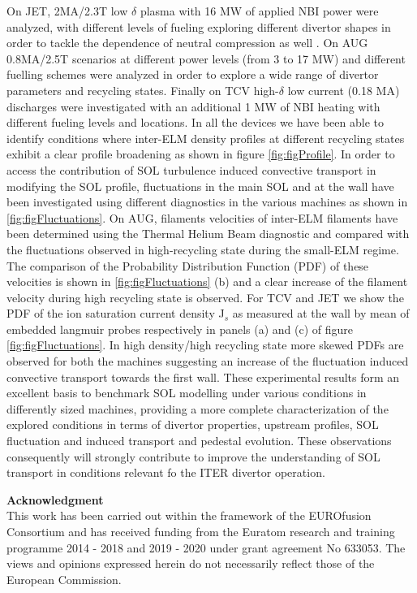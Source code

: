 \documentclass[12pt, a4paper, twoside]{article}
\begin{document}
On JET, 2MA/2.3T low $\delta$ plasma with 16 MW of
applied NBI power were analyzed, with different levels of fueling exploring different divertor shapes
in order to tackle the dependence of neutral compression as well
\cite{Tamain:2015cx}.
On AUG 0.8MA/2.5T scenarios at different power levels (from 3 to 17 MW) and different fuelling
schemes were analyzed in order to explore a wide range of divertor
parameters and recycling states.
Finally on TCV high-$\delta$ low current (0.18 MA)
discharges were investigated with an additional 1 MW of NBI heating
with different fueling levels and locations. In all the devices we have been able to
identify conditions where inter-ELM density profiles at different recycling states exhibit a clear profile broadening as shown in
figure \ref{fig:figProfile}. In order to access the contribution of SOL
turbulence induced convective transport in modifying the SOL profile,
fluctuations in the main SOL and at the wall have been investigated
using different diagnostics in the various machines as shown in
\ref{fig:figFluctuations}. On AUG,  filaments velocities of
inter-ELM filaments have been determined using the Thermal Helium Beam
diagnostic \cite{Griener:20183cf} and compared with the fluctuations
observed in high-recycling state during the small-ELM regime. The
comparison of the Probability Distribution Function (PDF) of these velocities is shown in
\ref{fig:figFluctuations} (b) and a clear increase of the filament velocity
during high recycling state is observed. For TCV and JET we show the
PDF of the ion saturation current
density J$_s$ as measured at the wall by mean of embedded langmuir
probes respectively in panels (a) and (c) of figure
\ref{fig:figFluctuations}.
In high density/high recycling state more skewed PDFs are
observed for both the machines suggesting an increase of the
fluctuation induced convective transport towards the first wall.
These experimental results form an excellent basis to benchmark SOL
modelling under various conditions in differently sized machines,
providing a more complete characterization of the
explored conditions in terms of divertor properties, upstream
profiles, SOL fluctuation and induced transport and pedestal evolution. These observations
consequently will strongly contribute to improve
the understanding of SOL transport in conditions relevant fo the ITER divertor operation.

\begingroup
{}
{\footnotesize\textbf{Acknowledgment}\\
This work has been carried out within the framework of the EUROfusion Consortium and has received funding from the Euratom research and training programme 2014 - 2018 and 2019 - 2020 under grant agreement No 633053. The views and opinions expressed herein do not necessarily reflect those of the European Commission.}
\begin{multicols}{2}
\setlength\bibitemsep{0pt}
\printbibliography[heading=none]
\end{multicols}
\endgroup
\end{document}
